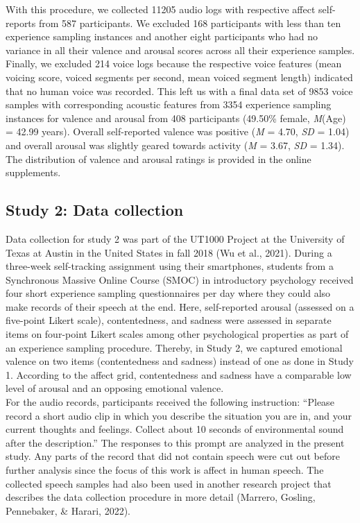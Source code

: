 \documentclass[
  english,
  man,floatsintext]{apa6}
\begin{document}
With this procedure, we collected 11205 audio logs with respective affect self-reports from 587 participants. We excluded 168 participants with less than ten experience sampling instances and another eight participants who had no variance in all their valence and arousal scores across all their experience samples. Finally, we excluded 214 voice logs because the respective voice features (mean voicing score, voiced segments per second, mean voiced segment length) indicated that no human voice was recorded.
This left us with a final data set of 9853 voice samples with corresponding acoustic features from 3354 experience sampling instances for valence and arousal from 408 participants (49.50\% female, \emph{M}(Age) = 42.99 years). Overall self-reported valence was positive (\emph{M} = 4.70, \emph{SD} = 1.04) and overall arousal was slightly geared towards activity (\emph{M} = 3.67, \emph{SD} = 1.34). The distribution of valence and arousal ratings is provided in the online supplements.

\hypertarget{study-2-data-collection}{%
\subsection{Study 2: Data collection}\label{study-2-data-collection}}

Data collection for study 2 was part of the UT1000 Project at the University of Texas at Austin in the United States in fall 2018 (Wu et al., 2021). During a three-week self-tracking assignment using their smartphones, students from a Synchronous Massive Online Course (SMOC) in introductory psychology received four short experience sampling questionnaires per day where they could also make records of their speech at the end. Here, self-reported arousal (assessed on a five-point Likert scale), contentedness, and sadness were assessed in separate items on four-point Likert scales among other psychological properties as part of an experience sampling procedure. Thereby, in Study 2, we captured emotional valence on two items (contentedness and sadness) instead of one as done in Study 1. According to the affect grid, contentedness and sadness have a comparable low level of arousal and an opposing emotional valence.\\
For the audio records, participants received the following instruction: ``Please record a short audio clip in which you describe the situation you are in, and your current thoughts and feelings. Collect about 10 seconds of environmental sound after the description.'' The responses to this prompt are analyzed in the present study. Any parts of the record that did not contain speech were cut out before further analysis since the focus of this work is affect in human speech. The collected speech samples had also been used in another research project that describes the data collection procedure in more detail (Marrero, Gosling, Pennebaker, \& Harari, 2022).
\end{document}
